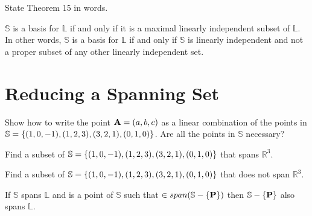 \begin{myexc}[\bd{c}]
	State Theorem 15 in words.
\end{myexc}

\begin{theorem}
	$\mathbb{S}$ is a basis for $\mathbb{L}$ if and only if it is a maximal linearly independent subset of $\mathbb{L}$. In other words, $\mathbb{S}$ is a basis for $\mathbb{L}$ if and only if $\mathbb{S}$ is linearly independent and not a proper subset of any other linearly independent set. 
\end{theorem}
\vspace{-.3in}\hspace{5in}\begin{annotation}
\end{annotation}


\section{Reducing a Spanning Set}    \label{Reducing a Spanning Set}

\begin{myexa}[\bd{a}]
	Show how to write the point $\textbf{A} = ({a},{b},{c})$  as a linear combination of the points in $\mathbb{S} = \{ ({1},{0},{-1}),({1},{2},{3}),({3},{2},{1}),({0},{1},{0}) \} $. Are all the points in $\mathbb{S}$ necessary?
\end{myexa}

\begin{myexb}[\bd{b}]
	Find a subset of $\mathbb{S} = \{ ({1},{0},{-1}),({1},{2},{3}),({3},{2},{1}),({0},{1},{0}) \} $  that spans $\mathbb{R}^3$.
\end{myexb}

\begin{myexc}[\bd{c}]
	Find a subset of $\mathbb{S} = \{ ({1},{0},{-1}),({1},{2},{3}),({3},{2},{1}),({0},{1},{0}) \} $  that does not span $\mathbb{R}^3$.
\end{myexc}

\begin{theorem}
	If  $\mathbb{S}$ spans $\mathbb{L}$ and  is a point of $\mathbb{S}$ such that  $\in span(\mathbb{S}-\{\textbf{P}\})$ then  $\mathbb{S}-\{\textbf{P}\}$ also spans $\mathbb{L}$. 
\end{theorem}
\vspace{-.3in}\hspace{5in}\begin{annotation}
\end{annotation}

